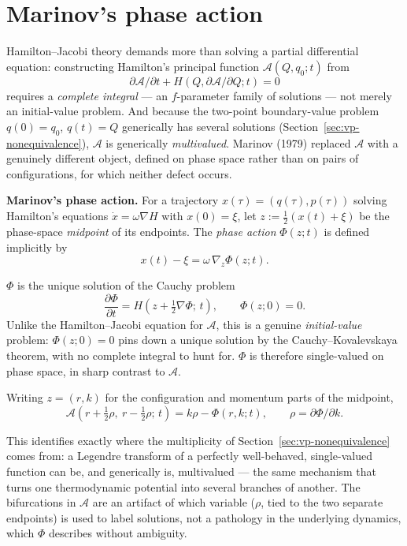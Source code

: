 \section{Marinov's phase action}
\label{sec:vp-marinov}

Hamilton--Jacobi theory demands more than solving a partial differential
equation: constructing Hamilton's principal function $\mathcal A(Q,q_0;t)$ from
\[
\partial\mathcal A/\partial t + H(Q,\partial\mathcal A/\partial Q;t)=0
\]
requires a \emph{complete integral} --- an $f$-parameter family of solutions
--- not merely an initial-value problem. And because the two-point
boundary-value problem $q(0)=q_0$, $q(t)=Q$ generically has several solutions
(Section~\ref{sec:vp-nonequivalence}), $\mathcal A$ is generically
\emph{multivalued}. Marinov (1979) replaced $\mathcal A$ with a genuinely
different object, defined on phase space rather than on pairs of
configurations, for which neither defect occurs.

\begin{definition}
\textbf{Marinov's phase action.} For a trajectory $x(\tau)=(q(\tau),p(\tau))$
    solving Hamilton's equations $\dot x=\omega\nabla H$ with $x(0)=\xi$, let
    $z:=\tfrac12(x(t)+\xi)$ be the phase-space \emph{midpoint} of its
    endpoints. The \emph{phase action} $\Phi(z;t)$ is defined implicitly by
\[
x(t) - \xi = \omega\,\nabla_z\Phi(z;t) .
\]
\end{definition}

$\Phi$ is the unique solution of the Cauchy problem
\[
\frac{\partial\Phi}{\partial t} = H\!\left(z+\tfrac12\nabla\Phi;\,t\right),
\qquad \Phi(z;0)=0 .
\]
Unlike the Hamilton--Jacobi equation for $\mathcal A$, this is a genuine
\emph{initial-value} problem: $\Phi(z;0)=0$ pins down a unique solution by the
Cauchy--Kovalevskaya theorem, with no complete integral to hunt for. $\Phi$ is
therefore single-valued on phase space, in sharp contrast to $\mathcal A$.

Writing $z=(r,k)$ for the configuration and momentum parts of the midpoint,
\[
\mathcal A\!\left(r+\tfrac12\rho,\ r-\tfrac12\rho;\,t\right) = k\rho -
\Phi(r,k;t), \qquad \rho=\partial\Phi/\partial k .
\]

This identifies exactly where the multiplicity of
Section~\ref{sec:vp-nonequivalence} comes from: a Legendre transform of a
perfectly well-behaved, single-valued function can be, and generically is,
multivalued --- the same mechanism that turns one thermodynamic potential into
several branches of another. The bifurcations in $\mathcal A$ are an artifact
of which variable ($\rho$, tied to the two separate endpoints) is used to label
solutions, not a pathology in the underlying dynamics, which $\Phi$ describes
without ambiguity.

